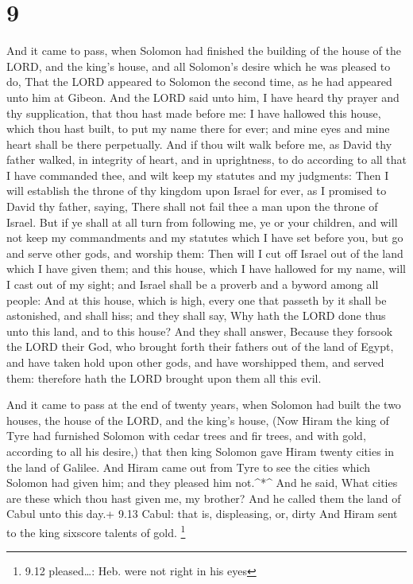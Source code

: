 \hypertarget{section-8}{%
\section{9}\label{section-8}}

 And it came to pass, when Solomon had finished the building
of the house of the LORD, and the king's house, and all Solomon's desire
which he was pleased to do,  That the LORD appeared to
Solomon the second time, as he had appeared unto him at Gibeon.
 And the LORD said unto him, I have heard thy prayer and thy
supplication, that thou hast made before me: I have hallowed this house,
which thou hast built, to put my name there for ever; and mine eyes and
mine heart shall be there perpetually.  And if thou wilt
walk before me, as David thy father walked, in integrity of heart, and
in uprightness, to do according to all that I have commanded thee, and
wilt keep my statutes and my judgments:  Then I will
establish the throne of thy kingdom upon Israel for ever, as I promised
to David thy father, saying, There shall not fail thee a man upon the
throne of Israel.  But if ye shall at all turn from
following me, ye or your children, and will not keep my commandments and
my statutes which I have set before you, but go and serve other gods,
and worship them:  Then will I cut off Israel out of the
land which I have given them; and this house, which I have hallowed for
my name, will I cast out of my sight; and Israel shall be a proverb and
a byword among all people:  And at this house, which is
high, every one that passeth by it shall be astonished, and shall hiss;
and they shall say, Why hath the LORD done thus unto this land, and to
this house?  And they shall answer, Because they forsook the
LORD their God, who brought forth their fathers out of the land of
Egypt, and have taken hold upon other gods, and have worshipped them,
and served them: therefore hath the LORD brought upon them all this
evil.

 And it came to pass at the end of twenty years, when
Solomon had built the two houses, the house of the LORD, and the king's
house,  (Now Hiram the king of Tyre had furnished Solomon
with cedar trees and fir trees, and with gold, according to all his
desire,) that then king Solomon gave Hiram twenty cities in the land of
Galilee.  And Hiram came out from Tyre to see the cities
which Solomon had given him; and they pleased him not.\^{}*\^{}
 And he said, What cities are these which thou hast given
me, my brother? And he called them the land of Cabul unto this day.+
9.13 Cabul: that is, displeasing, or, dirty  And Hiram sent
to the king sixscore talents of gold. \footnote{9.12 pleased\ldots: Heb.
  were not right in his eyes}

